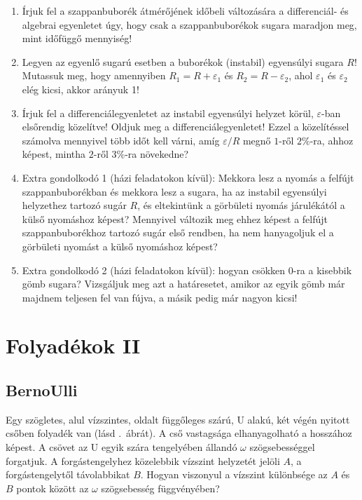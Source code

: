 \documentclass[12pt,a4paper]{scrartcl}
\begin{document}
\begin{enumerate}
\item Írjuk fel a szappanbuborék átmérőjének időbeli változására a differenciál- és algebrai egyenletet úgy, hogy csak a szappanbuborékok sugara maradjon meg, mint időfüggő mennyiség!
\item Legyen az egyenlő sugarú esetben a buborékok (instabil) egyensúlyi sugara $R$! Mutassuk meg, hogy amennyiben $R_1 = R + \varepsilon_1$ és $R_2 = R - \varepsilon_2$, ahol $\varepsilon_1$ és $\varepsilon_2$ elég kicsi, akkor arányuk 1!
\item Írjuk fel a differenciálegyenletet az instabil egyensúlyi helyzet körül, $\varepsilon$-ban elsőrendig közelítve! Oldjuk meg a differenciálegyenletet! Ezzel a közelítéssel számolva mennyivel több időt kell várni, amíg $\varepsilon/R$ megnő $1$-ről $2\%$-ra, ahhoz képest, mintha $2$-ről $3\%$-ra növekedne?
\item Extra gondolkodó 1 (házi feladatokon kívül): Mekkora lesz a nyomás a felfújt szappanbuborékban és mekkora lesz a sugara, ha az instabil egyensúlyi helyzethez tartozó sugár $R$, és eltekintünk a görbületi nyomás járulékától a külső nyomáshoz képest? Mennyivel változik meg ehhez képest a felfújt szappanbuborékhoz tartozó sugár első rendben, ha nem hanyagoljuk el a görbületi nyomást a külső nyomáshoz képest?
\item Extra gondolkodó 2 (házi feladatokon kívül): hogyan csökken 0-ra a kisebbik gömb sugara? Vizsgáljuk meg azt a határesetet, amikor az egyik gömb már majdnem teljesen fel van fújva, a másik pedig már nagyon kicsi!
\end{enumerate}

\iffalse
\section{Folyadékok II}
\subsection{BernoUlli}
Egy szögletes, alul vízszintes, oldalt függőleges szárú, U alakú, két végén nyitott csőben folyadék van (lásd .\ ábrát). A cső vastagsága elhanyagolható a hosszához képest. A csövet az U egyik szára tengelyében állandó $\omega$ szögsebességgel forgatjuk. A forgástengelyhez közelebbik vízszint helyzetét jelöli $A$, a forgástengelytől távolabbikat $B$. Hogyan viszonyul a vízszint különbsége az $A$ és $B$ pontok között az $\omega$ szögsebesség függvényében?
\end{document}

